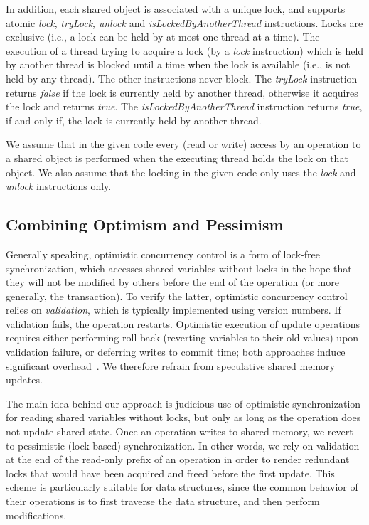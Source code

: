 In addition, each shared object is associated with a unique lock, and supports
atomic \emph{lock}, \emph{tryLock}, \emph{unlock} and \emph{isLockedByAnotherThread} instructions.
Locks are exclusive (i.e., a lock can be held by at most one thread at a time).
The execution of a thread
trying to acquire a lock (by a \emph{lock} instruction) which is
held by another thread is blocked until a time when the
lock is available (i.e., is not held by any thread).
The other instructions never block.
The \emph{tryLock} instruction returns \emph{false} if the lock is currently held by another thread, otherwise it acquires the lock and returns \emph{true}.
The \emph{isLockedByAnotherThread} instruction returns \emph{true}, if and only if, the lock is currently held by another thread.

We assume that in the given code every (read
or write) access by an operation to a shared object is performed when the
executing thread holds the lock on that object.
We also assume that the locking in the given code only uses the \emph{lock} and \emph{unlock} instructions only.

\subsection{Combining Optimism and Pessimism}\label{ssec:overview}

Generally speaking, optimistic concurrency control is a form of lock-free synchronization, which accesses shared variables without locks in the hope that they will not be modified by others before the end of the operation (or more generally, the transaction). To verify the latter, optimistic concurrency control relies on \emph{validation}, which is typically implemented using version numbers. If validation fails, the operation restarts. Optimistic execution of update operations requires either performing roll-back (reverting variables to their old values) upon validation failure, or deferring writes to commit time; both approaches induce significant overhead~\cite{Cascaval:2008}. We therefore refrain from speculative shared memory updates.



The main idea behind our approach is judicious use of optimistic synchronization for reading
shared variables without locks, but only as long as the operation does not update shared state. Once an operation
writes to shared memory, we revert to pessimistic (lock-based) synchronization. In
other words, we rely on validation at the end of the read-only prefix of an operation in order to render redundant
locks that would have been acquired and freed before the first update.
This scheme is particularly suitable for data structures,
since the common behavior of their operations
is to first traverse the data structure, and then
perform modifications.

